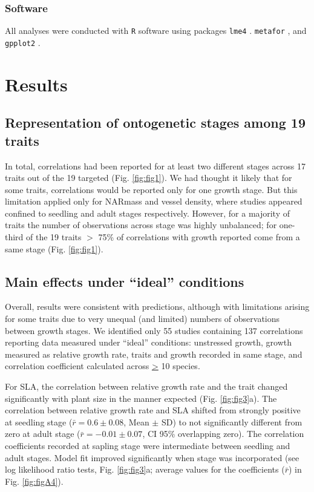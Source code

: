 \documentclass[a4paper,11pt]{article}
\begin{document}
\subsubsection*{Software}

All analyses were conducted with \texttt{R} software \citep{Ralanguageanden:2014wf} using packages \texttt{lme4} \citep{Bates-2014}. \texttt{metafor} \citep{Viechtbauer-2010}, and \texttt{gpplot2} \citep{Wickham:2009}.


\section*{Results}\label{results}

\subsection*{Representation of ontogenetic stages among 19 traits}
In total, correlations had been reported for at least two different stages across 17 traits out of the 19 targeted (Fig. \ref{fig:fig1}). We had thought it likely that for some traits, correlations would be reported only for one growth stage. But this limitation applied only for NARmass and vessel density, where studies appeared confined to seedling and adult stages respectively. However, for a majority of traits the number of observations across stage was highly unbalanced; for one-third of the 19 traits $>$ 75\% of correlations with growth reported come from a same stage (Fig. \ref{fig:fig1}).

\subsection*{Main effects under ``ideal'' conditions}

Overall, results were consistent with predictions, although with limitations arising for some traits due to very unequal (and limited) numbers of observations between growth stages. We identified only 55 studies containing 137 correlations reporting data measured under ``ideal'' conditions: unstressed growth, growth measured as relative growth rate, traits and growth recorded in same stage, and correlation coefficient calculated across \underline{\textgreater} 10 species.

For SLA, the correlation between relative growth rate and the trait changed significantly with plant size in the manner expected (Fig. \ref{fig:fig3}a). The correlation between relative growth rate and SLA shifted from strongly positive at seedling stage ($\bar{r}=0.6 \pm 0.08$, Mean $\pm$ SD) to not significantly different from zero at adult stage ($\bar{r}= -0.01 \pm 0.07$, CI 95\% overlapping zero). The correlation coefficients recorded at sapling stage were intermediate between seedling and adult stages. Model fit improved significantly when stage was incorporated (see log likelihood ratio tests, Fig. \ref{fig:fig3}a; average values for the coefficients ($\bar{r}$) in Fig. \ref{fig:figA4}).
\end{document}
